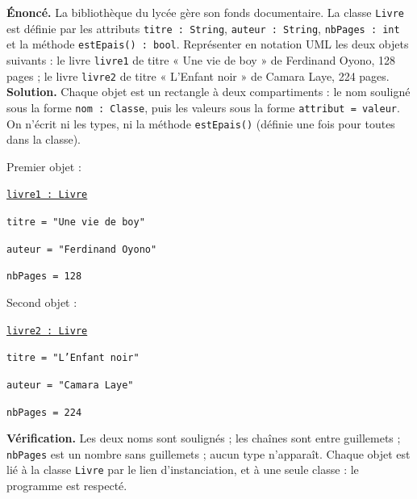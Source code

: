\documentclass[11pt]{article}
\begin{document}
\begin{exoresolu}
\textbf{Énoncé.} La bibliothèque du lycée gère son fonds documentaire. La classe \texttt{Livre} est définie par les attributs \texttt{titre : String}, \texttt{auteur : String}, \texttt{nbPages : int} et la méthode \texttt{estEpais() : bool}. Représenter en notation UML les deux objets suivants : le livre \texttt{livre1} de titre « Une vie de boy » de Ferdinand Oyono, 128 pages ; le livre \texttt{livre2} de titre « L'Enfant noir » de Camara Laye, 224 pages.
\tcblower
\textbf{Solution.} Chaque objet est un rectangle à deux compartiments : le nom souligné sous la forme \texttt{nom : Classe}, puis les valeurs sous la forme \texttt{attribut = valeur}. On n'écrit ni les types, ni la méthode \texttt{estEpais()} (définie une fois pour toutes dans la classe).

Premier objet :

\texttt{\underline{livre1 : Livre}}

\texttt{titre = "Une vie de boy"}

\texttt{auteur = "Ferdinand Oyono"}

\texttt{nbPages = 128}

Second objet :

\texttt{\underline{livre2 : Livre}}

\texttt{titre = "L'Enfant noir"}

\texttt{auteur = "Camara Laye"}

\texttt{nbPages = 224}

\textbf{Vérification.} Les deux noms sont soulignés ; les chaînes sont entre guillemets ; \texttt{nbPages} est un nombre sans guillemets ; aucun type n'apparaît. Chaque objet est lié à la classe \texttt{Livre} par le lien d'instanciation, et à une seule classe : le programme est respecté.
\end{exoresolu}
\end{document}
